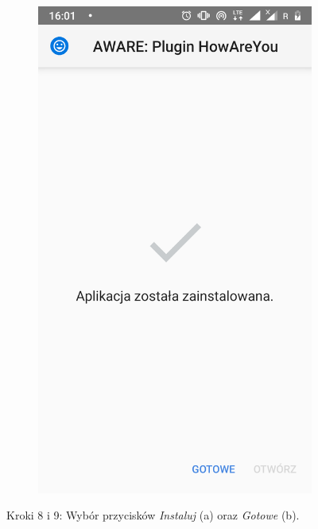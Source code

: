 \begin{enumerate}
\begin{figure}[H]
\begin{subfigure}{0.35\textwidth}
			\subcaption{\label{subfigure_a}}
		\end{subfigure}
		\begin{subfigure}{0.35\textwidth}
			\centering
			\includegraphics[scale=0.14]{dodatekA/2_9.png}
			\subcaption{\label{subfigure_b}}
		\end{subfigure}
		\caption{ Kroki 8 i 9: Wybór przycisków \textit{Instaluj} (a) oraz \textit{Gotowe} (b).}
	\end{figure}
	\clearpage 
	
\end{enumerate}

